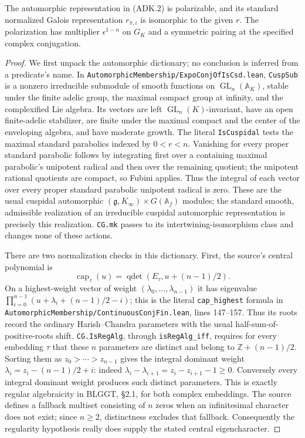 \begin{lemma}
\label{claim:ADK3}
The automorphic representation in (ADK.2) is polarizable, and its
standard normalized Galois representation $r_{\pi,\iota}$ is
isomorphic to the given $r$.  The polarization has multiplier
$\epsilon^{1-n}$ on $G_K$ and a symmetric pairing at the specified
complex conjugation.
\end{lemma}
\begin{proof}
We first unpack the automorphic dictionary; no conclusion is inferred
from a predicate's name.  In
\texttt{AutomorphicMembership/ExpoConjOfIsCsd.lean},
\texttt{CuspSub} is a nonzero irreducible submodule of smooth
functions on $\operatorname{GL}_n(\mathbb A_K)$, stable under the
finite adelic group, the maximal compact group at infinity, and the
complexified Lie algebra.  Its vectors are left
$\operatorname{GL}_n(K)$-invariant, have an open finite-adelic
stabilizer, are finite under the maximal compact and the center of
the enveloping algebra, and have moderate growth.  The literal
\texttt{IsCuspidal} tests the maximal standard parabolics indexed
by $0<r<n$.  Vanishing for every proper standard parabolic follows
by integrating first over a containing maximal parabolic's
unipotent radical and then over the remaining quotient; the
unipotent rational quotients are compact, so Fubini applies.
Thus the integral of each vector over every proper standard
parabolic unipotent radical is zero.  These are the usual cuspidal
automorphic $(\mathfrak g,K_\infty)\times G(\mathbb A_f)$ modules;
the standard smooth, admissible realization of an irreducible
cuspidal automorphic representation is precisely this realization.
\texttt{CG.mk} passes to its intertwining-isomorphism class and
changes none of these actions.

There are two normalization checks in this dictionary.
First, the source's central polynomial is
\[
 \operatorname{cap}_{\tau}(u)
    =\operatorname{qdet}(E_{\tau},u+(n-1)/2).
\]
On a highest-weight vector of weight $(\lambda_0,\ldots,
\lambda_{n-1})$ it has eigenvalue
$\prod_{i=0}^{n-1}(u+\lambda_i+(n-1)/2-i)$;
this is the literal \texttt{cap\_highest} formula in
\texttt{AutomorphicMembership/ContinuousConjFin.lean},
lines 147--157.  Thus its roots record the ordinary
Harish--Chandra parameters with the usual half-sum-of-positive-roots
shift.  \texttt{CG.IsRegAlg}, through
\texttt{isRegAlg\_iff}, requires for every embedding $\tau$ that
these $n$ parameters are distinct and belong to
$\mathbb Z+(n-1)/2$.  Sorting them as
$z_0>\cdots>z_{n-1}$ gives the integral dominant weight
$\lambda_i=z_i-(n-1)/2+i$: indeed
$\lambda_i-\lambda_{i+1}=z_i-z_{i+1}-1\ge0$.
Conversely every integral dominant weight produces such distinct
parameters.  This is exactly regular algebraicity in BLGGT,
\S2.1, for both complex embeddings.  The source defines a fallback
multiset consisting of $n$ zeros when an infinitesimal character
does not exist; since $n\ge2$, distinctness excludes that fallback.
Consequently the regularity hypothesis really does supply the
stated central eigencharacter.


\end{proof}
